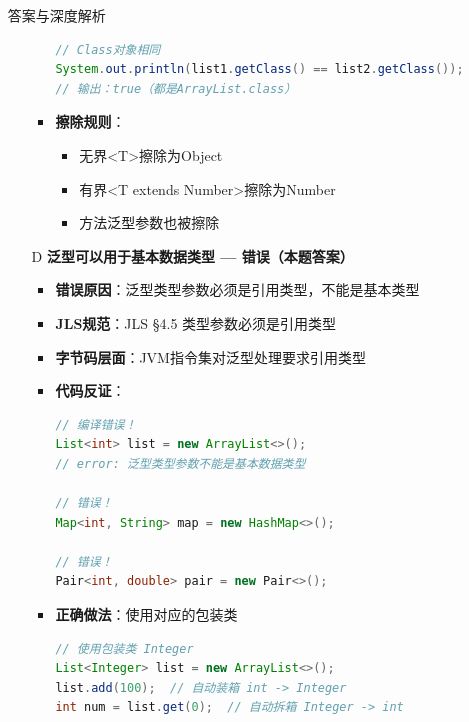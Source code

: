 \documentclass[12pt, a4paper]{ctexart}
\begin{document}
\begin{enumerate}[label=\textbf{\arabic*.}]
\begin{bluebox}{答案与深度解析}
\begin{itemize}[leftmargin=*, nosep, label={}]
\begin{itemize}[label={}, leftmargin=*, nosep]
\begin{lstlisting}[language=Java]
// Class对象相同
System.out.println(list1.getClass() == list2.getClass());
// 输出：true（都是ArrayList.class）
				      \end{lstlisting}
				            \item \textbf{擦除规则}：
				                  \begin{itemize}[label={}, nosep]
					                  \item 无界<T>擦除为Object
					                  \item 有界<T extends Number>擦除为Number
					                  \item 方法泛型参数也被擦除
				                  \end{itemize}
			            \end{itemize}

			      \item[D] \textbf{泛型可以用于基本数据类型 — 错误（本题答案）}
			            \begin{itemize}[label={}, leftmargin=*, nosep]
				            \item \textbf{错误原因}：泛型类型参数必须是引用类型，不能是基本类型
				            \item \textbf{JLS规范}：JLS §4.5 类型参数必须是引用类型
				            \item \textbf{字节码层面}：JVM指令集对泛型处理要求引用类型
				            \item \textbf{代码反证}：
				                  \begin{lstlisting}[language=Java]
// 编译错误！
List<int> list = new ArrayList<>();
// error: 泛型类型参数不能是基本数据类型

// 错误！
Map<int, String> map = new HashMap<>();

// 错误！
Pair<int, double> pair = new Pair<>();
				      \end{lstlisting}
				            \item \textbf{正确做法}：使用对应的包装类
				                  \begin{lstlisting}[language=Java]
// 使用包装类 Integer
List<Integer> list = new ArrayList<>();
list.add(100);  // 自动装箱 int -> Integer
int num = list.get(0);  // 自动拆箱 Integer -> int


\end{lstlisting}
\end{itemize}
\end{itemize}
\end{bluebox}
\end{enumerate}
\end{document}
